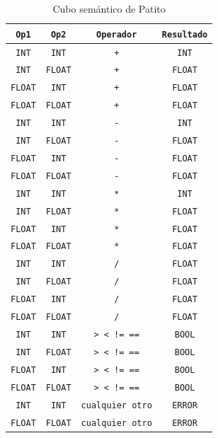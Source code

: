 \documentclass[12pt, letterpaper]{article}
\theoremstyle{definition}
\begin{document}
\begin{table}[H]
\centering
\caption{Cubo semántico de Patito}
\label{tab:cubo}
\begin{tabular}{|c|c|c|c|}
    \hline
    \texttt{Op1} & \texttt{Op2} & \texttt{Operador} & \texttt{Resultado} \\
    \hline
    \texttt{INT}   & \texttt{INT}   & \texttt{+} & \texttt{INT}   \\ \hline
    \texttt{INT}   & \texttt{FLOAT} & \texttt{+} & \texttt{FLOAT} \\ \hline
    \texttt{FLOAT} & \texttt{INT}   & \texttt{+} & \texttt{FLOAT} \\ \hline
    \texttt{FLOAT} & \texttt{FLOAT} & \texttt{+} & \texttt{FLOAT} \\ \hline
    \texttt{INT}   & \texttt{INT}   & \texttt{-} & \texttt{INT}   \\ \hline
    \texttt{INT}   & \texttt{FLOAT} & \texttt{-} & \texttt{FLOAT} \\ \hline
    \texttt{FLOAT} & \texttt{INT}   & \texttt{-} & \texttt{FLOAT} \\ \hline
    \texttt{FLOAT} & \texttt{FLOAT} & \texttt{-} & \texttt{FLOAT} \\ \hline
    \texttt{INT}   & \texttt{INT}   & \texttt{*} & \texttt{INT}   \\ \hline
    \texttt{INT}   & \texttt{FLOAT} & \texttt{*} & \texttt{FLOAT} \\ \hline
    \texttt{FLOAT} & \texttt{INT}   & \texttt{*} & \texttt{FLOAT} \\ \hline
    \texttt{FLOAT} & \texttt{FLOAT} & \texttt{*} & \texttt{FLOAT} \\ \hline
    \texttt{INT}   & \texttt{INT}   & \texttt{/} & \texttt{FLOAT} \\ \hline
    \texttt{INT}   & \texttt{FLOAT} & \texttt{/} & \texttt{FLOAT} \\ \hline
    \texttt{FLOAT} & \texttt{INT}   & \texttt{/} & \texttt{FLOAT} \\ \hline
    \texttt{FLOAT} & \texttt{FLOAT} & \texttt{/} & \texttt{FLOAT} \\ \hline
    \texttt{INT}   & \texttt{INT}   & \texttt{> < != ==} & \texttt{BOOL} \\ \hline
    \texttt{INT}   & \texttt{FLOAT} & \texttt{> < != ==} & \texttt{BOOL} \\ \hline
    \texttt{FLOAT} & \texttt{INT}   & \texttt{> < != ==} & \texttt{BOOL} \\ \hline
    \texttt{FLOAT} & \texttt{FLOAT} & \texttt{> < != ==} & \texttt{BOOL} \\ \hline
    \texttt{INT}   & \texttt{INT}   & \texttt{cualquier otro} & \texttt{ERROR} \\ \hline
    \texttt{FLOAT} & \texttt{FLOAT} & \texttt{cualquier otro} & \texttt{ERROR} \\ \hline
\end{tabular}
\end{table}
\end{document}
